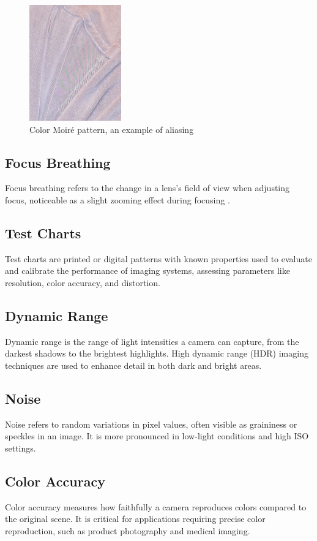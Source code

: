 \begin{figure}[htbp]
\centering
\includegraphics[height=5cm]{Images/color_moire.jpg}
\caption{Color Moiré pattern, an example of aliasing \cite{Aliasing}}
\label{fig:moire}
\end{figure}

\subsection{Focus Breathing}
Focus breathing refers to the change in a lens's field of view when adjusting focus, noticeable as a slight zooming effect during focusing \cite{FocusBreathing}.

\subsection{Test Charts}
Test charts are printed or digital patterns with known properties used to evaluate and calibrate the performance of imaging systems, assessing parameters like resolution, color accuracy, and distortion.

\subsection{Dynamic Range}
Dynamic range is the range of light intensities a camera can capture, from the darkest shadows to the brightest highlights. High dynamic range (HDR) imaging techniques are used to enhance detail in both dark and bright areas.

\subsection{Noise}
Noise refers to random variations in pixel values, often visible as graininess or speckles in an image. It is more pronounced in low-light conditions and high ISO settings.

\subsection{Color Accuracy}
Color accuracy measures how faithfully a camera reproduces colors compared to the original scene. It is critical for applications requiring precise color reproduction, such as product photography and medical imaging.

